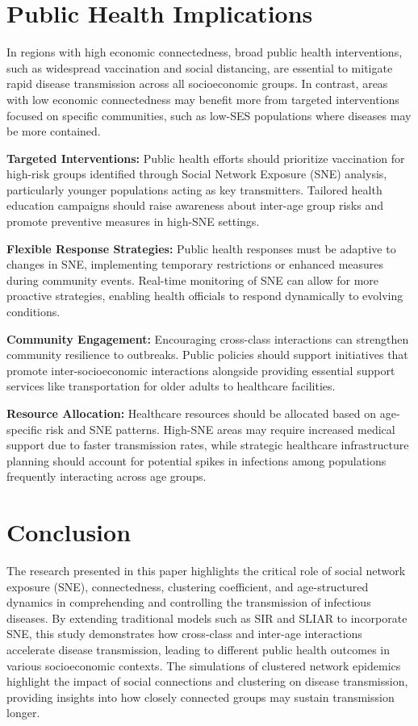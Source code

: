 \documentclass[9 pt]{article} %
\begin{document}
\section{Public Health Implications}
In regions with high economic connectedness, broad public health interventions, such as widespread vaccination and social distancing, are essential to mitigate rapid disease transmission across all socioeconomic groups. In contrast, areas with low economic connectedness may benefit more from targeted interventions focused on specific communities, such as low-SES populations where diseases may be more contained.

\textbf{Targeted Interventions:} Public health efforts should prioritize vaccination for high-risk groups identified through Social Network Exposure (SNE) analysis, particularly younger populations acting as key transmitters. Tailored health education campaigns should raise awareness about inter-age group risks and promote preventive measures in high-SNE settings.

\textbf{Flexible Response Strategies:} Public health responses must be adaptive to changes in SNE, implementing temporary restrictions or enhanced measures during community events. Real-time monitoring of SNE can allow for more proactive strategies, enabling health officials to respond dynamically to evolving conditions.

\textbf{Community Engagement:} Encouraging cross-class interactions can strengthen community resilience to outbreaks. Public policies should support initiatives that promote inter-socioeconomic interactions alongside providing essential support services like transportation for older adults to healthcare facilities.

\textbf{Resource Allocation:} Healthcare resources should be allocated based on age-specific risk and SNE patterns. High-SNE areas may require increased medical support due to faster transmission rates, while strategic healthcare infrastructure planning should account for potential spikes in infections among populations frequently interacting across age groups.

\section{Conclusion}
The research presented in this paper highlights the critical role of social network exposure (SNE), connectedness, clustering coefficient, and age-structured dynamics in comprehending and controlling the transmission of infectious diseases. By extending traditional models such as SIR and SLIAR to incorporate SNE, this study demonstrates how cross-class and inter-age interactions accelerate disease transmission, leading to different public health outcomes in various socioeconomic contexts. The simulations of clustered network epidemics highlight the impact of social connections and clustering on disease transmission, providing insights into how closely connected groups may sustain transmission longer.
\end{document}
